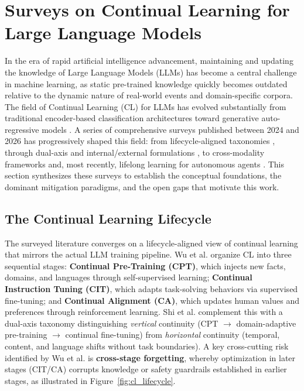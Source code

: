 \section{Surveys on Continual Learning for Large Language Models}

In the era of rapid artificial intelligence advancement, maintaining and updating the knowledge of Large Language Models (LLMs) has become a central challenge in machine learning, as static pre-trained knowledge quickly becomes outdated relative to the dynamic nature of real-world events and domain-specific corpora. The field of Continual Learning (CL) for LLMs has evolved substantially from traditional encoder-based classification architectures toward generative auto-regressive models \parencite{wu2024continuallearninglargelanguage, shi2024continuallearninglargelanguage}. A series of comprehensive surveys published between 2024 and 2026 has progressively shaped this field: from lifecycle-aligned taxonomies \parencite{wu2024continuallearninglargelanguage}, through dual-axis and internal/external formulations \parencite{shi2024continuallearninglargelanguage, zheng2024lifelonglearninglargelanguage}, to cross-modality frameworks \parencite{guo2025continuallearninggenerativeai} and, most recently, lifelong learning for autonomous agents \parencite{11328884, zzz47zzz2025awesome}. This section synthesizes these surveys to establish the conceptual foundations, the dominant mitigation paradigms, and the open gaps that motivate this work.

\subsection{The Continual Learning Lifecycle}
The surveyed literature converges on a lifecycle-aligned view of continual learning that mirrors the actual LLM training pipeline. Wu et al. \parencite{wu2024continuallearninglargelanguage} organize CL into three sequential stages: \textbf{Continual Pre-Training (CPT)}, which injects new facts, domains, and languages through self-supervised learning; \textbf{Continual Instruction Tuning (CIT)}, which adapts task-solving behaviors via supervised fine-tuning; and \textbf{Continual Alignment (CA)}, which updates human values and preferences through reinforcement learning. Shi et al. \parencite{shi2024continuallearninglargelanguage} complement this with a dual-axis taxonomy distinguishing \emph{vertical} continuity (CPT $\rightarrow$ domain-adaptive pre-training $\rightarrow$ continual fine-tuning) from \emph{horizontal} continuity (temporal, content, and language shifts without task boundaries). A key cross-cutting risk identified by Wu et al. is \textbf{cross-stage forgetting}, whereby optimization in later stages (CIT/CA) corrupts knowledge or safety guardrails established in earlier stages, as illustrated in Figure~\ref{fig:cl_lifecycle}.

